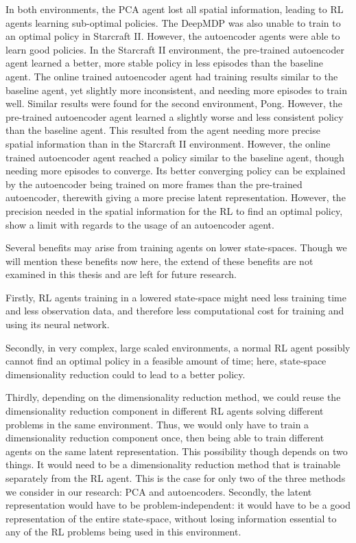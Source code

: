 In both environments, the PCA agent lost all spatial information, leading to RL agents learning sub-optimal policies. The DeepMDP was also unable to train to an optimal policy in Starcraft II. However, the autoencoder agents were able to learn good policies. In the Starcraft II environment, the pre-trained autoencoder agent learned a better, more stable policy in less episodes than the baseline agent. The online trained autoencoder agent had training results similar to the baseline agent, yet slightly more inconsistent, and needing more episodes to train well. Similar results were found for the second environment, Pong. However, the pre-trained autoencoder agent learned a slightly worse and less consistent policy than the baseline agent. This resulted from the agent needing more precise spatial information than in the Starcraft II environment. However, the online trained autoencoder agent reached a policy similar to the baseline agent, though needing more episodes to converge. Its better converging policy can be explained by the autoencoder being trained on more frames than the pre-trained autoencoder, therewith giving a more precise latent representation. However, the precision needed in the spatial information for the RL to find an optimal policy, show a limit with regards to the usage of an autoencoder agent.

Several benefits may arise from training agents on lower state-spaces. Though we will mention these benefits now here, the extend of these benefits are not examined in this thesis and are left for future research.

Firstly, RL agents training in a lowered state-space might need less training time and less observation data, and therefore less computational cost for training and using its neural network. 

Secondly, in very complex, large scaled environments, a normal RL agent possibly cannot find an optimal policy in a feasible amount of time; here, state-space dimensionality reduction could to lead to a better policy. 

Thirdly, depending on the dimensionality reduction method, we could reuse the dimensionality reduction component in different RL agents solving different problems in the same environment. Thus, we would only have to train a dimensionality reduction component once, then being able to train different agents on the same latent representation. This possibility though depends on two things. It would need to be a dimensionality reduction method that is trainable separately from the RL agent. This is the case for only two of the three methods we consider in our research: PCA and autoencoders. Secondly, the latent representation would have to be problem-independent: it would have to be a good representation of the entire state-space, without losing information essential to any of the RL problems being used in this environment.

